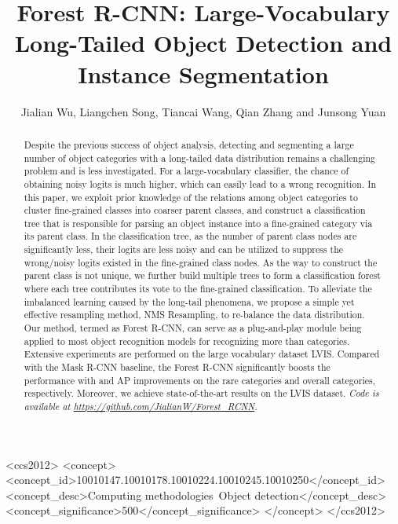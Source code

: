 \documentclass[sigconf]{acmart}
\begin{document}
\title{Forest R-CNN: Large-Vocabulary Long-Tailed Object Detection and Instance Segmentation}

\author{Jialian Wu, Liangchen Song, Tiancai Wang, Qian Zhang and Junsong Yuan}


\renewcommand{\shortauthors}{Jialian Wu, et al.}

\begin{abstract}
Despite the previous success of object analysis, detecting and segmenting a large number of object categories with a long-tailed data distribution remains a challenging problem and is less investigated. For a large-vocabulary classifier, the chance of obtaining noisy logits is much higher, which can easily lead to a wrong recognition. In this paper, we exploit prior knowledge of the relations among object categories to cluster fine-grained classes into coarser parent classes, and construct a classification tree that is responsible for parsing an object instance into a fine-grained category via its parent class. In the classification tree, as the number of parent class nodes are significantly less, their logits are less noisy and can be utilized to suppress the wrong/noisy logits existed in the fine-grained class nodes. As the way to construct the parent class is not unique, we further build multiple trees to form a classification forest where each tree contributes its vote to the fine-grained classification. To alleviate the imbalanced learning caused by the long-tail phenomena, we propose a simple yet effective resampling method, NMS Resampling, to re-balance the data distribution. Our method, termed as Forest R-CNN, can serve as a plug-and-play module being applied to most object recognition models for recognizing more than  categories. Extensive experiments are performed on the large vocabulary dataset LVIS. Compared with the Mask R-CNN baseline, the Forest R-CNN significantly boosts the performance with  and  AP improvements on the rare categories and overall categories, respectively. Moreover, we achieve state-of-the-art results on the LVIS dataset. \emph{Code is available at \textcolor{mypink}{\url{https://github.com/JialianW/Forest_RCNN}.}}
\vspace{-1mm}
\end{abstract}

\begin{CCSXML}
	<ccs2012>
	<concept>
	<concept_id>10010147.10010178.10010224.10010245.10010250</concept_id>
	<concept_desc>Computing methodologies~Object detection</concept_desc>
	<concept_significance>500</concept_significance>
	</concept>
	</ccs2012>
\end{CCSXML}
\end{document}
